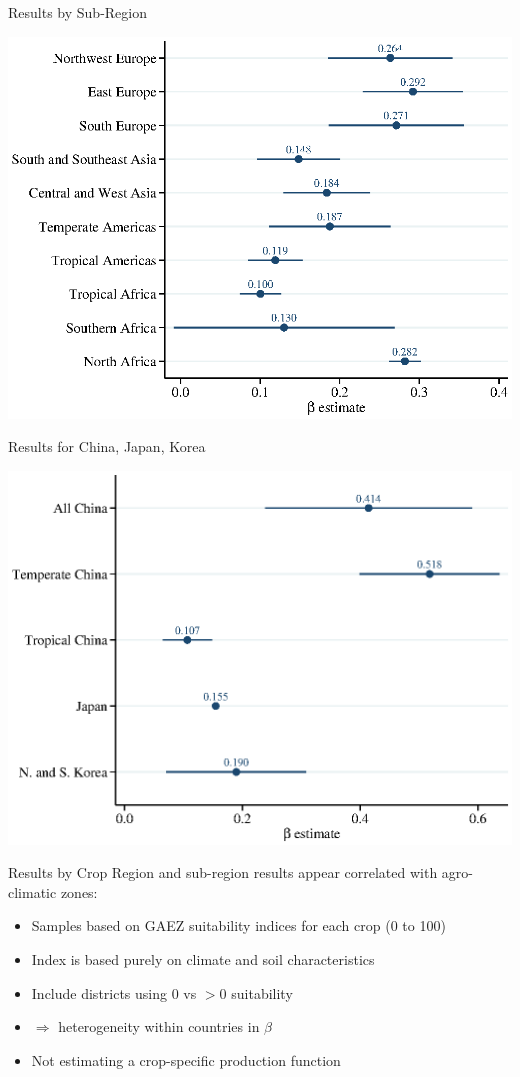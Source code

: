 \documentclass[10pt, xcolor=dvipsnames]{beamer}
\begin{document}
\begin{frame}{Results by Sub-Region}\label{subregion}
\begin{center}
\includegraphics[width=.8\textwidth]{fig_coef_subregion.eps}
\end{center}
\hfill \hyperlink{subregiontab}{}
\end{frame}

\begin{frame}{Results for China, Japan, Korea}\label{china}
\begin{center}
\includegraphics[width=.8\textwidth]{fig_coef_china.eps}
\end{center}
\hfill \hyperlink{chinareg}{}
\end{frame}

\begin{frame}{Results by Crop}
Region and sub-region results appear correlated with agro-climatic zones:
\begin{itemize}
  \item Samples based on GAEZ suitability indices for each crop (0 to 100)
  \item Index is based purely on climate and soil characteristics
  \item Include districts using 0 vs $>0$ suitability
  \item $\Rightarrow$ heterogeneity within countries in $\beta$
  \item Not estimating a crop-specific production function
\end{itemize}
\end{frame}
\end{document}

